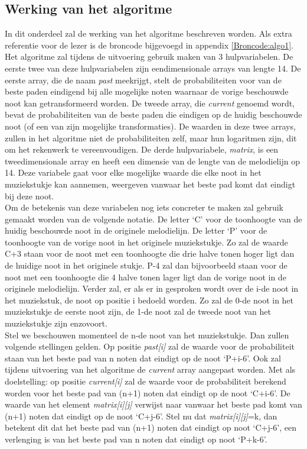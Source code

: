 \subsection{Werking van het algoritme}
In dit onderdeel zal de werking van het algoritme beschreven worden. Als extra referentie voor de lezer is de broncode bijgevoegd in appendix \ref{Broncode:algo1}.\\ 
Het algoritme zal tijdens de uitvoering gebruik maken van 3 hulpvariabelen. De eerste twee van deze hulpvariabelen zijn eendimensionale arrays van lengte 14. De eerste array, die de naam \textit{past} meekrijgt, stelt de probabiliteiten voor van de beste paden eindigend bij alle mogelijke noten waarnaar de vorige beschouwde noot kan getransformeerd worden. De tweede array, die \textit{current} genoemd wordt, bevat de probabiliteiten van de beste paden die eindigen op de huidig beschouwde noot (of een van zijn mogelijke transformaties). De waarden in deze twee arrays, zullen in het algoritme niet de probabiliteiten zelf, maar hun logaritmen zijn, dit om het rekenwerk te vereenvoudigen. De derde hulpvariabele, \textit{matrix}, is een tweedimensionale array en heeft een dimensie van de lengte van de melodielijn op 14. Deze variabele gaat voor elke mogelijke waarde die elke noot in het muziekstukje kan aannemen, weergeven vanwaar het beste pad komt dat eindigt bij deze noot.\\
Om de betekenis van deze variabelen nog iets concreter te maken zal gebruik gemaakt worden van de volgende notatie. De letter `C' voor de toonhoogte van de huidig beschouwde noot in de originele melodielijn. De letter `P' voor de toonhoogte van de vorige noot in het originele muziekstukje. Zo zal de waarde C+3 staan voor de noot met een toonhoogte die drie halve tonen hoger ligt dan de huidige noot in het originele stukje. P-4 zal dan bijvoorbeeld staan voor de noot met een toonhoogte die 4 halve tonen lager ligt dan de vorige noot in de originele melodielijn. Verder zal, er als er in gesproken wordt over de i-de noot in het muziekstuk, de noot op positie i bedoeld worden. Zo zal de 0-de noot in het muziekstukje de eerste noot zijn, de 1-de noot zal de tweede noot van het muziekstukje zijn enzovoort.\\ 
Stel we beschouwen momenteel de n-de noot van het muziekstukje. Dan zullen volgende stellingen gelden. Op positie \textit{past[i]} zal de waarde voor de probabiliteit staan van het beste pad van n noten dat eindigt op de noot `P+i-6'. Ook zal tijdens uitvoering van het algoritme de \textit{current} array aangepast worden. Met als doelstelling: op positie \textit{current[i]} zal de waarde voor de probabiliteit berekend worden voor het beste pad van (n+1) noten dat eindigt op de noot `C+i-6'. De waarde van het element \textit{matrix[i][j]} verwijst naar vanwaar het beste pad komt van (n+1) noten dat eindigt op de noot `C+j-6'. Stel nu dat \textit{matrix[i][j]}=k, dan betekent dit dat het beste pad van (n+1) noten dat eindigt op noot `C+j-6', een verlenging is van het beste pad van n noten dat eindigt op noot `P+k-6'. \\
